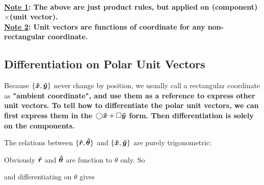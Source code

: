 \documentclass[class=article, crop=false, 12pt]{standalone}
\begin{document}
\hfill\\
\bf{\ul{Note 1}}: The above are just product rules, but applied on (component)$\times$(unit vector).\\

\bf{\ul{Note 2}}: Unit vectors are functions of coordinate for any non-rectangular coordinate.




\subsection{Differentiation on Polar Unit Vectors}

Because $\{\vu*{x}, \vu*{y}\}$ never change by position, 
we usually call a rectangular coordinate as \bf{"ambient coordinate"},
and use them as a reference to express other unit vectors. 
To tell how to differentiate the polar unit vectors, 
we can first express them in the $\bigcirc\vu*{x} + \square\vu*{y}$ form. 
Then differentiation is solely on the components.


The relations between $\{\vu*{r}, \vu*{\theta}\}$ and $\{\vu*{x}, \vu*{y}\}$ are purely trigonometric:

Obviously $\vu*{r}$ and $\vu*{\theta}$ are function to $\theta$ only. So

and differentiating on $\theta$ gives
\end{document}
